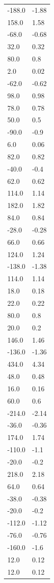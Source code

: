 \begin{longtable}{ll}
-188.0 & -1.88 \\
158.0 & 1.58 \\
-68.0 & -0.68 \\
32.0 & 0.32 \\
80.0 & 0.8 \\
2.0 & 0.02 \\
-62.0 & -0.62 \\
98.0 & 0.98 \\
78.0 & 0.78 \\
50.0 & 0.5 \\
-90.0 & -0.9 \\
6.0 & 0.06 \\
82.0 & 0.82 \\
-40.0 & -0.4 \\
62.0 & 0.62 \\
114.0 & 1.14 \\
182.0 & 1.82 \\
84.0 & 0.84 \\
-28.0 & -0.28 \\
66.0 & 0.66 \\
124.0 & 1.24 \\
-138.0 & -1.38 \\
114.0 & 1.14 \\
18.0 & 0.18 \\
22.0 & 0.22 \\
80.0 & 0.8 \\
20.0 & 0.2 \\
146.0 & 1.46 \\
-136.0 & -1.36 \\
434.0 & 4.34 \\
48.0 & 0.48 \\
16.0 & 0.16 \\
60.0 & 0.6 \\
-214.0 & -2.14 \\
-36.0 & -0.36 \\
174.0 & 1.74 \\
-110.0 & -1.1 \\
-20.0 & -0.2 \\
218.0 & 2.18 \\
64.0 & 0.64 \\
-38.0 & -0.38 \\
-20.0 & -0.2 \\
-112.0 & -1.12 \\
-76.0 & -0.76 \\
-160.0 & -1.6 \\
12.0 & 0.12 \\
12.0 & 0.12 \\

\end{longtable}
